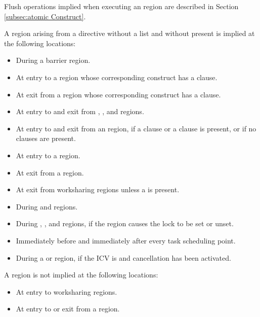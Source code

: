 Flush operations implied when executing an  region are described in
Section \ref{subsec:atomic Construct}. 

A  region arising from a  directive without a list and
without  present is implied at the following locations:
\begin{itemize}
\item During a barrier region.
\item At entry to a  region whose corresponding construct has a  clause.
\item At exit from a  region whose corresponding construct has a  clause.
\item At entry to and exit from , ,  and  regions.
\item At entry to and exit from an  region, if a  clause or a  clause is present, or if no clauses are present.
\item At entry to a  region. 
\item At exit from a  region. 
\item At exit from worksharing regions unless a  is present.
\item During  and  regions.
\item During , ,  
and  regions, if the region causes the lock to be set or unset.
\item Immediately before and immediately after every task scheduling point.
\item During a  or  region, if the  ICV is  and cancellation has been activated.
\end{itemize}

\begin{note}
A  region is not implied at the following locations:

\begin{itemize}
\item At entry to worksharing regions.

\item At entry to or exit from a  region.
\end{itemize}
\end{note}

